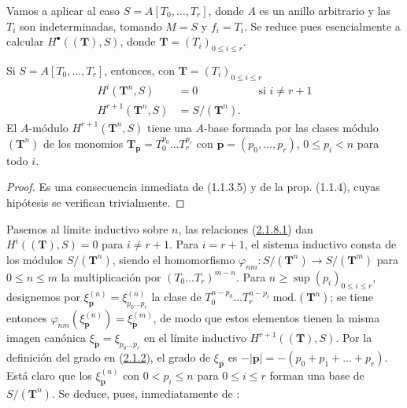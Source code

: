 \begin{env}[2.1.7]
\label{III.2.1.7}
\label{III.2.1.7-fr}

Vamos a aplicar  al caso $S=A[T_0,\ldots,T_r]$, donde $A$ es un anillo arbitrario y las $T_i$ son indeterminadas, tomando $M=S$ y $f_i=T_i$. Se reduce pues esencialmente a calcular $H^\bullet((\mathbf T),S)$, donde $\mathbf T=(T_i)_{0\leq i\leq r}$.
\end{env}

\begin{lemma}[2.1.8]
\label{III.2.1.8}
\label{III.2.1.8-fr}
Si $S=A[T_0,\ldots,T_r]$, entonces, con $\mathbf T=(T_i)_{0\leq i\leq r}$
\begin{align}
\label{III.2.1.8.1-fr}
\tag{2.1.8.1}
H^i(\mathbf T^n,S)&=0 &&\text{si }i\neq r+1\\
\label{III.2.1.8.2-fr}
\tag{2.1.8.2}
H^{r+1}(\mathbf T^n,S)&=S/(\mathbf T^n).
\end{align}
El $A$-módulo $H^{r+1}(\mathbf T^n,S)$ tiene una $A$-base formada por las clases módulo $(\mathbf T^n)$ de los monomios
$\mathbf T_{\mathbf p}=T_0^{p_0}\ldots T_r^{p_r}$ con
$\mathbf p=(p_0,\ldots,p_r)$, $0\leq p_i<n$ para todo $i$.
\end{lemma}

\begin{proof}
Es una consecuencia inmediata de (1.1.3.5) y de la prop. (1.1.4), cuyas
hipótesis se verifican trivialmente.
\end{proof}

\begin{env}[2.1.9]
\label{III.2.1.9-fr}
Pasemos al límite inductivo sobre $n$, las relaciones (\hyperref[III.2.1.8.1]{2.1.8.1}) dan $H^i((\mathbf T),S)=0$ para $i\neq r+1$.
Para $i=r+1$, el sistema inductivo consta de los módulos $S/(\mathbf T^n)$, siendo el homomorfismo
$\varphi_{nm}:S/(\mathbf T^n)\longrightarrow S/(\mathbf T^m)$
para $0\leq n\leq m$
la multiplicación por $(T_0\ldots T_r)^{m-n}$.
Para $n\geq\sup(p_i)_{0\leq i\leq r}$, designemos por
$\xi_{\mathbf p}^{(n)}=\xi_{p_0\ldots p_r}^{(n)}$ la clase de
$T_0^{n-p_0}\ldots T_r^{n-p_r}\ \mathrm{mod.}(\mathbf T^n)$; se tiene entonces
$\varphi_{nm}(\xi_{\mathbf p}^{(n)})=\xi_{\mathbf p}^{(m)}$, de modo que estos elementos tienen la misma imagen canónica $\xi_{\mathbf p}=\xi_{p_0\ldots p_r}$ en el límite inductivo $H^{r+1}((\mathbf T),S)$.
Por la definición del grado en (\hyperref[III.2.1.2]{2.1.2}), el grado de $\xi_{\mathbf p}$ es $-|\mathbf p|=-(p_0+p_1+\ldots+p_r)$.
Está claro que los $\xi_{\mathbf p}^{(n)}$ con $0<p_i\leq n$ para $0\leq i\leq r$ forman una base de $S/(\mathbf T^n)$.
Se deduce, pues, inmediatamente de :
\end{env}

